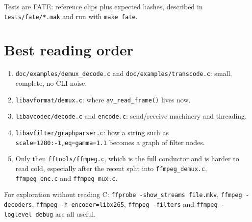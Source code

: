 \documentclass[11pt]{article}
\begin{document}
Tests are FATE: reference clips plus expected hashes, described in
\verb|tests/fate/*.mak| and run with \verb|make fate|.

\section{Best reading order}

\begin{enumerate}
  \item \verb|doc/examples/demux_decode.c| and \verb|doc/examples/transcode.c|:
        small, complete, no CLI noise.
  \item \verb|libavformat/demux.c|: where \verb|av_read_frame()| lives now.
  \item \verb|libavcodec/decode.c| and \verb|encode.c|: send/receive machinery
        and threading.
  \item \verb|libavfilter/graphparser.c|: how a string such as
        \verb|scale=1280:-1,eq=gamma=1.1| becomes a graph of filter nodes.
  \item Only then \verb|fftools/ffmpeg.c|, which is the full conductor and is
        harder to read cold, especially after the recent split into
        \verb|ffmpeg_demux.c|, \verb|ffmpeg_enc.c| and \verb|ffmpeg_mux.c|.
\end{enumerate}

For exploration without reading C: \verb|ffprobe -show_streams file.mkv|,
\verb|ffmpeg -decoders|, \verb|ffmpeg -h encoder=libx265|, \verb|ffmpeg -filters|
and \verb|ffmpeg -loglevel debug| are all useful.
\end{document}

